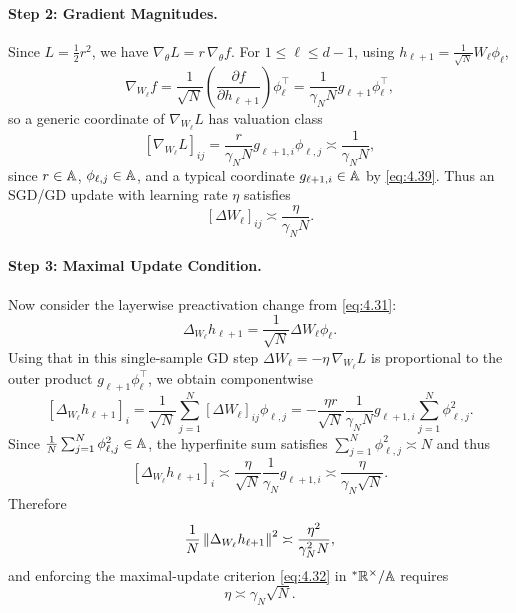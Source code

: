 \paragraph{Step 2: Gradient Magnitudes.} Since $L = \frac{1}{2}r^2$, we have $\nabla_\theta L = r\,\nabla_\theta f$. For $1 \le \ell \le d - 1$, using $h_{\ell+1} = \frac{1}{\sqrt{N}}W_\ell \phi_\ell$,
\begin{equation}\label{eq:4.40}
\nabla_{W_\ell} f = \frac{1}{\sqrt{N}}\left(\frac{\partial f}{\partial h_{\ell+1}}\right)\phi_\ell^\top = \frac{1}{\gamma_N N} g_{\ell+1}\phi_\ell^\top,
\end{equation}
so a generic coordinate of $\nabla_{W_\ell} L$ has valuation class
\begin{equation}\label{eq:4.41}
[\nabla_{W_\ell} L]_{ij} = \frac{r}{\gamma_N N} g_{\ell+1, i}\phi_{\ell, j} \asymp \frac{1}{\gamma_N N},
\end{equation}
since $r \in \mathbb{A}$, $\phi_{\ell, j} \in \mathbb{A}$, and a typical coordinate $g_{\ell+1, i} \in \mathbb{A}$ by \eqref{eq:4.39}. Thus an SGD/GD update with learning rate $\eta$ satisfies
\begin{equation}\label{eq:4.42}
[\Delta W_\ell]_{ij} \asymp \frac{\eta}{\gamma_N N}.
\end{equation}

\paragraph{Step 3: Maximal Update Condition.} Now consider the layerwise preactivation change from \eqref{eq:4.31}:
\begin{equation}\label{eq:4.43}
\Delta_{W_\ell} h_{\ell+1} = \frac{1}{\sqrt{N}}\Delta W_\ell \phi_\ell.
\end{equation}
Using that in this single-sample GD step $\Delta W_\ell = -\eta\,\nabla_{W_\ell} L$ is proportional to the outer product $g_{\ell+1}\phi_\ell^\top$, we obtain componentwise
\begin{equation}\label{eq:4.44}
[\Delta_{W_\ell} h_{\ell+1}]_i = \frac{1}{\sqrt{N}}\sum_{j=1}^N [\Delta W_\ell]_{ij}\phi_{\ell, j} = -\frac{\eta r}{\sqrt{N}}\frac{1}{\gamma_N N} g_{\ell+1, i}\sum_{j=1}^N \phi_{\ell, j}^2.
\end{equation}
Since $\frac{1}{N}\sum_{j=1}^N \phi_{\ell, j}^2 \in \mathbb{A}$, the hyperfinite sum satisfies $\sum_{j=1}^N \phi_{\ell, j}^2 \asymp N$ and thus
\begin{equation}\label{eq:4.45}
[\Delta_{W_\ell} h_{\ell+1}]_i \asymp \frac{\eta}{\sqrt{N}}\frac{1}{\gamma_N} g_{\ell+1, i} \asymp \frac{\eta}{\gamma_N\sqrt{N}}.
\end{equation}
Therefore
\begin{equation}\label{eq:4.46}
\frac{1}{N}\left\lVert \Delta_{W_\ell} h_{\ell+1} \right\rVert^2 \asymp \frac{\eta^2}{\gamma_N^2 N},
\end{equation}
and enforcing the maximal-update criterion \eqref{eq:4.32} in ${}^*\mathbb{R}^\times / \mathbb{A}$ requires
\begin{equation}\label{eq:4.47}
\eta \asymp \gamma_N\sqrt{N}.
\end{equation}

